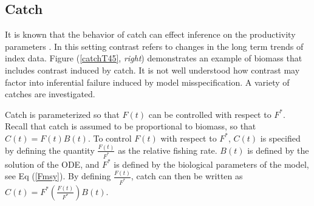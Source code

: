 \documentclass[12pt]{article}
\begin{document}
%  
%
%



%


%
\subsection{Catch \label{catch}}	


%
It is known that the behavior of catch can effect inference on the productivity %
parameters . %
In this setting contrast refers to changes in the long term trends of index data. 
Figure (\ref{catchT45}, \emph{right}) demonstrates an example of biomass 
that includes contrast induced by catch. It 
is not well understood how contrast may factor into inferential failure induced by model %
misspecification. A variety of catches are investigated.

%
Catch is parameterized so that $F(t)$ can be controlled with respect to $F^*$. 
Recall that catch is assumed to be proportional to biomass, so that $C(t)=F(t)B(t)$.
To control $F(t)$ with respect to $F^*$, $C(t)$ is specified by defining the 
quantity $\frac{F(t)}{F^*}$ as the relative fishing rate. $B(t)$ is defined 
by the solution of the ODE, and $F^*$ is defined by the biological parameters 
of the model, see Eq (\ref{Fmsy}). By defining $\frac{F(t)}{F^*}$, catch 
can then be written as \mbox{$C(t)=F^*\left(\frac{F(t)}{F^*}\right)B(t)$.}
\end{document}
